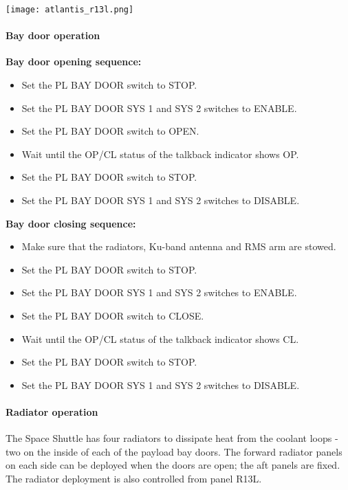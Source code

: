 \documentclass[Orbiter User Manual.tex]{subfiles}
\begin{document}
\begin{center}
\texttt{[image: atlantis\_r13l.png]}
\end{center}

\paragraph{Bay door operation}
\label{para:atlantis_baydoor}

\textbf{Bay door opening sequence:}
\begin{itemize}
\item Set the PL BAY DOOR switch to STOP.
\item Set the PL BAY DOOR SYS 1 and SYS 2 switches to ENABLE.
\item Set the PL BAY DOOR switch to OPEN.
\item Wait until the OP/CL status of the talkback indicator shows OP.
\item Set the PL BAY DOOR switch to STOP.
\item Set the PL BAY DOOR SYS 1 and SYS 2 switches to DISABLE.
\end{itemize}

\noindent
\textbf{Bay door closing sequence:}
\begin{itemize}
\item Make sure that the radiators, Ku-band antenna and RMS arm are stowed.
\item Set the PL BAY DOOR switch to STOP.
\item Set the PL BAY DOOR SYS 1 and SYS 2 switches to ENABLE.
\item Set the PL BAY DOOR switch to CLOSE.
\item Wait until the OP/CL status of the talkback indicator shows CL.
\item Set the PL BAY DOOR switch to STOP.
\item Set the PL BAY DOOR SYS 1 and SYS 2 switches to DISABLE.
\end{itemize}

\paragraph{Radiator operation}
The Space Shuttle has four radiators to dissipate heat from the coolant loops - two on the inside of each of the payload bay doors. The forward radiator panels on each side can be deployed when the doors are open; the aft panels are fixed. The radiator deployment is also controlled from panel R13L.\\
\end{document}
